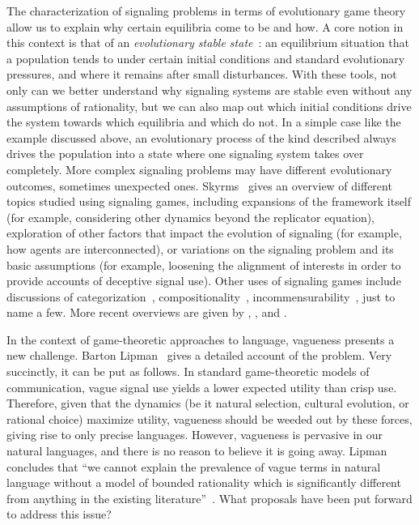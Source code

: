 \documentclass[a4paper]{article}
\begin{document}
The characterization of signaling problems in terms of evolutionary game theory allow us to explain why certain equilibria come to be and how.
A core notion in this context is that of an \emph{evolutionary stable state}~\parencite{maynard_smith_evolution_1982}: an equilibrium situation that a population tends to under certain initial conditions and standard evolutionary pressures, and where it remains after small disturbances.
With these tools, not only can we better understand why signaling systems are stable even without any assumptions of rationality, but we can also map out which initial conditions drive the system towards which equilibria and which do not.
In a simple case like the example discussed above, an evolutionary process of the kind described always drives the population into a state where one signaling system takes over completely. %
More complex signaling problems may have different evolutionary outcomes, sometimes unexpected ones.
Skyrms~\parencite*{skyrms_signals_2010} gives an overview of different topics studied using signaling games, including expansions of the framework itself (for example, considering other dynamics beyond the replicator equation), exploration of other factors that impact the evolution of signaling (for example, how agents are interconnected), or variations on the signaling problem and its basic assumptions (for example, loosening the alignment of interests in order to provide accounts of deceptive signal use).
Other uses of signaling games include discussions of categorization~\parencite[\emph{e.g.}][]{jager_language_2007}, compositionality~\parencite[\emph{e.g.}][]{barrett_evolution_2009}, incommensurability~\parencite[\emph{e.g.}][]{barrett_faithful_2010}, just to name a few.
More recent overviews are given by \textcites{huttegger_how_2014}, \textcite{huttegger_dynamics_2014}, and \citet{FrankeWagner2014:Game-Theory-and}.

In the context of game-theoretic approaches to language, vagueness presents a new challenge.
Barton Lipman~\parencite*{lipman_why_2009} gives a detailed account of the problem.
Very succinctly, it can be put as follows.
In standard game-theoretic models of communication, vague signal use yields a lower expected utility than crisp use.
Therefore, given that the dynamics (be it natural selection, cultural evolution, or rational choice) maximize utility, vagueness should be weeded out by these forces, giving rise to only precise languages.
However, vagueness is pervasive in our natural languages, and there is no reason to believe it is going away.
Lipman concludes that ``we cannot explain the prevalence of vague terms in natural language without a model of bounded rationality which is significantly different from anything in the existing literature''~\parencite*[1]{lipman_why_2009}.
What proposals have been put forward to address this issue?
\end{document}
